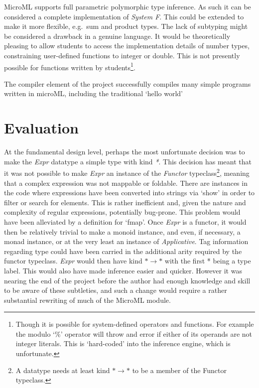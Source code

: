 \documentclass[12pt, a4paper]{report}
\begin{document}
MicroML supports full parametric polymorphic type inference. As such it can be considered a complete
implementation of \textit{System F}. This could be extended to make it more flexible, e.g.\ sum and
product types. The lack of subtyping might be considered a drawback in a genuine language. It would
be theoretically pleasing to allow students to access the implementation details of number types,
constraining user-defined functions to integer or double. This is not presently possible for
functions written by students\footnote{Though it is possible for system-defined operators and
functions. For example the modulo `\%' operator will throw and error if either of its operands are
not integer literals. This is `hard-coded' into the inference engine, which is unfortunate.}.

The compiler element of the project successfully compiles many simple programs written in microML,
including the traditional `hello world'

\section{Evaluation}
At the fundamental design level, perhaps the most unfortunate decision was to make the \textit{Expr}
datatype a simple type with kind \textit{*}. This decision has meant that it was not possible to
make \textit{Expr} an instance of the \textit{Functor} typeclass\footnote{A datatype needs at least
kind $ * \rightarrow * $ to be a member of the Functor typeclass.}, meaning that a complex
expression was not mappable or foldable. There are instances in the code where expressions have been
converted into strings via `show' in order to filter or search for elements. This is rather
inefficient and, given the nature and complexity of regular expressions, potentially bug-prone. This
problem would have been alleviated by a definition for `fmap'. Once \textit{Expr} is a functor, it
would then be relatively trivial to make a monoid instance, and even, if necessary, a monad
instance, or at the very least an instance of \textit{Applicative}. Tag information regarding type
could have been carried in the additional arity required by the functor typeclass. \textit{Expr}
would then have kind $ * \rightarrow * $ with the first * being a type label. This would also have
made inference easier and quicker. However it was nearing the end of the project before the author
had enough knowledge and skill to be aware of these subtleties, and such a change would require a
rather substantial rewriting of much of the MicroML module.
\end{document}
